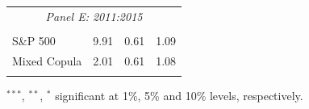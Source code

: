 \documentclass[pdf,9pt,xcolor=dvipsnames,hide notes]{beamer}
\begin{document}
\begin{frame}
\begin{threeparttable}[H]
\begin{tabularx}{\textwidth}{@{\extracolsep{\fill}}llll@{}}
		\multicolumn{4}{c}{\textit{Panel E: 2011:2015}} \\
		&       &       &       \\
		S\&P 500 & 9.91  & 0.61  & 1.09 \\
		Mixed Copula & 2.01  & 0.61  & 1.08 \\
		\multicolumn{1}{r}{} & \multicolumn{1}{r}{} & \multicolumn{1}{r}{} & \multicolumn{1}{r}{} \\
		\bottomrule
	\end{tabularx}%
	\begin{tablenotes}
		\item \scriptsize $^{\ast\ast\ast}$, $^{\ast\ast}$, $^{\ast}$  significant at 1\%, 5\% and 10\% levels, respectively.
	\end{tablenotes}
	\label{tab:table106}%
\end{threeparttable}%

\end{frame}
\end{document}
